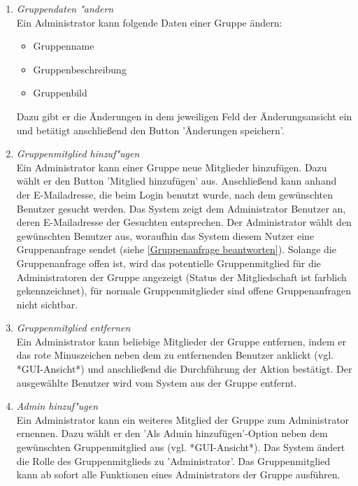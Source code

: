 \documentclass[parskip=full]{scrartcl}
\def\threedigits#1{%
  \ifnum#1<100 0\fi
  \ifnum#1<10 0\fi
  \number#1}
\begin{document}
\begin{enumerate}[label={\textbf{/F\protect\threedigits{\theenumi}0/}}, leftmargin=*, resume]

	\item \textit{Gruppendaten "andern}\label{Gruppendaten ändern}\\
	Ein Administrator kann folgende Daten einer Gruppe ändern:
	\begin{itemize}
	\item Gruppenname
	\item \colorbox{shadecolor}{Gruppenbeschreibung}
	\item \colorbox{shadecolor}{Gruppenbild}
	\end{itemize}
	Dazu gibt er die Änderungen in dem jeweiligen Feld der Änderungsansicht ein und betätigt anschließend den Button 'Änderungen speichern'.
	
	\item \textit{Gruppenmitglied hinzuf"ugen}\label{Mitglieder hinzufügen} \\
	Ein Administrator kann einer Gruppe neue Mitglieder hinzufügen. Dazu wählt er den Button 'Mitglied hinzufügen' aus. Anschließend kann anhand der E-Mailadresse, die beim Login benutzt wurde, nach dem gewünschten Benutzer gesucht werden. Das System zeigt dem Administrator Benutzer an, deren E-Mailadresse der Gesuchten entsprechen. Der Administrator wählt den gewünschten Benutzer aus, woraufhin das System diesem Nutzer eine Gruppenanfrage sendet (siehe \ref{Gruppenanfrage beantworten}). Solange die Gruppenanfrage offen ist, wird das potentielle Gruppenmitglied für die Administratoren der Gruppe angezeigt (Status der Mitgliedschaft ist farblich gekennzeichnet), für normale Gruppenmitglieder sind offene Gruppenanfragen nicht sichtbar.
	
	\item \textit{Gruppenmitglied entfernen}\label{Gruppenmitglied entfernen}\\
	Ein Administrator kann beliebige Mitglieder der Gruppe entfernen, indem er das rote Minuszeichen neben dem zu entfernenden Benutzer anklickt (vgl. *GUI-Ansicht*) und anschließend die Durchführung der Aktion bestätigt. Der ausgewählte Benutzer wird vom System aus der Gruppe entfernt.
	
	\item \colorbox{shadecolor}{\textit{Admin hinzuf"ugen}}\label{Admin hinzufügen} \\
	Ein Administrator kann ein weiteres Mitglied der Gruppe zum Administrator ernennen. Dazu wählt er den 'Als Admin hinzufügen'-Option neben dem gewünschten Gruppenmitglied aus (vgl. *GUI-Ansicht*). Das System ändert die Rolle des Gruppenmitglieds zu 'Administrator'. Das Gruppenmitglied kann ab sofort alle Funktionen eines Administrators der Gruppe ausführen.
	

\end{enumerate}
\end{document}
